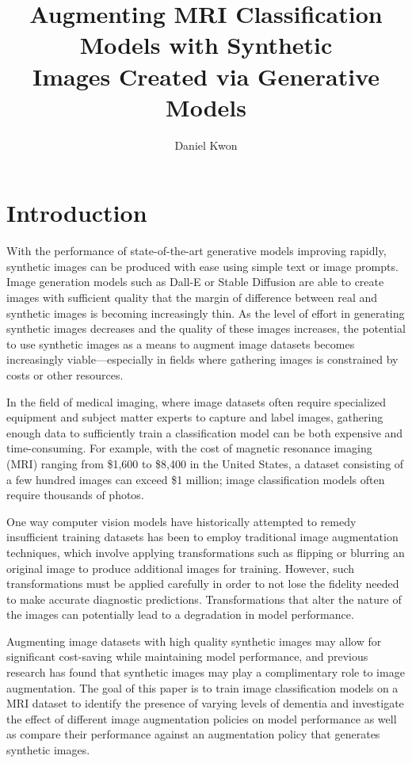 \documentclass [MS] {uclathes}
\title          {Augmenting MRI Classification Models with Synthetic \\
                Images Created via Generative Models}
\author         {Daniel Kwon}
\begin{document}
\makeintropages


\chapter{Introduction}
With the performance of state-of-the-art generative models improving rapidly, synthetic images can be produced with ease 
using simple text or image prompts. Image generation models such as Dall-E or Stable Diffusion are able to create images 
with sufficient quality that the margin of difference between real and synthetic images is becoming increasingly thin. 
As the level of effort in generating synthetic images decreases and the quality of these images increases, the potential 
to use synthetic images as a means to augment image datasets becomes increasingly viable---especially in fields where 
gathering images is constrained by costs or other resources.

In the field of medical imaging, where image datasets often require specialized equipment and subject matter experts to 
capture and label images, gathering enough data to sufficiently train a classification model can be both expensive and 
time-consuming. For example, with the cost of magnetic resonance imaging (MRI) ranging from \$1,600 to \$8,400 in the 
United States, a dataset consisting of a few hundred images can exceed \$1 million; image classification models often 
require thousands of photos. 

One way computer vision models have historically attempted to remedy insufficient training datasets has been to employ 
traditional image augmentation techniques, which involve applying transformations such as flipping or blurring an 
original image to produce additional images for training. However, such transformations must be applied carefully in 
order to not lose the fidelity needed to make accurate diagnostic predictions. Transformations that alter the nature of 
the images can potentially lead to a degradation in model performance.

Augmenting image datasets with high quality synthetic images may allow for significant cost-saving while maintaining 
model performance, and previous research has found that synthetic images may play a complimentary role to image 
augmentation. The goal of this paper is to train image classification models on a MRI dataset to identify the presence 
of varying levels of dementia and investigate the effect of different image augmentation policies on model performance 
as well as compare their performance against an augmentation policy that generates synthetic images.
\end{document}
